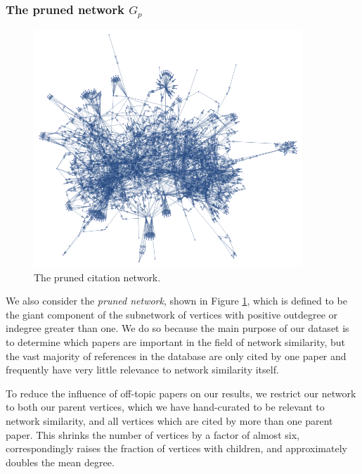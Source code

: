 \documentclass[12pt]{thesis}
\theoremstyle{plain}
\theoremstyle{definition}
\theoremstyle{remark}
\begin{document}
\subsubsection{The pruned network $G_p$}

\begin{figure}[h]
\centering
\includegraphics[width=0.9\textwidth]{subnetwork.png}
\caption{The pruned citation network.}
\label{fig:pruned_network}
\end{figure}

We also consider the \textit{pruned network}, shown in Figure \ref{fig:pruned_network}, which is defined to be the giant component of the subnetwork of vertices with positive outdegree or indegree greater than one. We do so because the main purpose of our dataset is to determine which papers are important in the field of network similarity, but the vast majority of references in the database are only cited by one paper and frequently have very little relevance to network similarity itself. 

To reduce the influence of off-topic papers on our results, we restrict our network to both our parent vertices, which we have hand-curated to be relevant to network similarity, and all vertices which are cited by more than one parent paper. This shrinks the number of vertices by a factor of almost six, correspondingly raises the fraction of vertices with children, and approximately doubles the mean degree.
\end{document}
